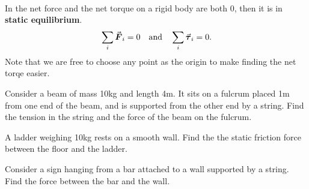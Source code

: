 \documentclass[../newtonian_mechanics.tex]{subfiles}
\begin{document}
        \paragraph{}
        In the net force and the net torque on a rigid body are both 0, then it is in \textbf{static equilibrium}.
        \begin{eqnarray}
            \sum_i\vec{\boldsymbol F}_i=0\quad\text{and}\quad\sum_i\vec{\boldsymbol\tau}_i=0.
        \end{eqnarray}
        Note that we are free to choose any point as the origin to make finding the net torqe easier.
        \begin{example}
            Consider a beam of mass 10kg and length 4m.
            It sits on a fulcrum placed 1m from one end of the beam, and is supported from the other end by a string.
            Find the tension in the string and the force of the beam on the fulcrum.
        \end{example}
        \begin{example}
            A ladder weighing 10kg rests on a smooth wall.
            Find the the static friction force between the floor and the ladder.
        \end{example}
        \begin{example}
            Consider a sign hanging from a bar attached to a wall supported by a string.
            Find the force between the bar and the wall.
        \end{example}
\end{document}
